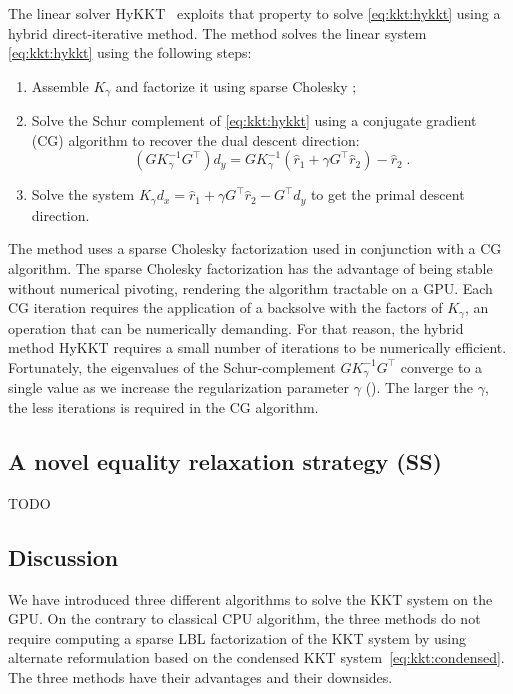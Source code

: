 The linear solver HyKKT~\cite{regev2023hykkt}
exploits that property to solve \eqref{eq:kkt:hykkt} using a hybrid
direct-iterative method. The method solves the linear system
\eqref{eq:kkt:hykkt} using the following steps:
\begin{enumerate}
  \item Assemble $K_\gamma$ and factorize it using sparse Cholesky ;
  \item Solve the Schur complement of \eqref{eq:kkt:hykkt} using a conjugate gradient (CG)
    algorithm to recover the dual descent direction:
    \begin{equation}
      (G K_\gamma^{-1} G^\top) d_y = G K_\gamma^{-1} (\hat{r}_1 + \gamma G^\top \hat{r}_2) - \hat{r}_2 \; .
    \end{equation}
  \item Solve the system $K_\gamma d_x = \hat{r}_1 + \gamma G^\top \hat{r}_2 - G^\top d_y$
    to get the primal descent direction.
\end{enumerate}
The method uses a sparse Cholesky factorization used in conjunction with a CG algorithm.
The sparse Cholesky factorization has the advantage of being stable without
numerical pivoting, rendering the algorithm tractable on a GPU.
Each CG iteration requires the application of a backsolve with the
factors of $K_\gamma$, an operation that can be numerically demanding. For that reason, the
hybrid method HyKKT requires a small number of iterations to be numerically efficient.
Fortunately, the eigenvalues of the Schur-complement $G K_\gamma^{-1} G^\top$
converge to a single value as we increase the regularization parameter
$\gamma$ (\cite[Theorem 4]{regev2023hykkt}). The larger the $\gamma$, the less iterations is required in the CG algorithm.


\subsection{A novel equality relaxation strategy (SS)}

TODO

\subsection{Discussion}
We have introduced three different algorithms to solve
the KKT system on the GPU. On the contrary to classical CPU algorithm,
the three methods do not require computing a sparse LBL factorization of the KKT
system by using alternate reformulation based on the condensed KKT
system~\eqref{eq:kkt:condensed}.
The three methods have their advantages and their downsides.

